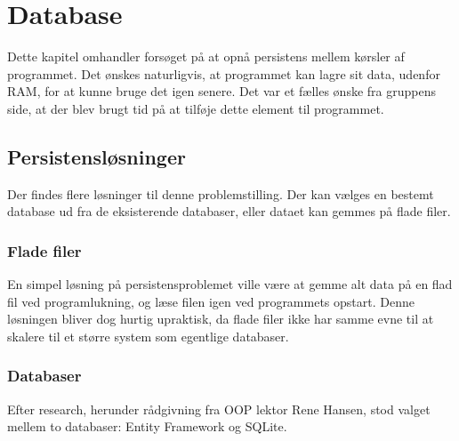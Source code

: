 \chapter{Database}\label{chap:database}

Dette kapitel omhandler forsøget på at opnå persistens mellem kørsler af programmet.
Det ønskes naturligvis, at programmet kan lagre sit data, udenfor RAM, for at kunne bruge det igen senere. 
Det var et fælles ønske fra gruppens side, at der blev brugt tid på at tilføje dette element til programmet. 

\section{Persistensløsninger}

Der findes flere løsninger til denne problemstilling. 
Der kan vælges en bestemt database ud fra de eksisterende databaser, eller dataet kan gemmes på flade filer.

\subsection{Flade filer}
En simpel løsning på persistensproblemet ville være at gemme alt data på en flad fil ved programlukning, og læse filen igen ved programmets opstart.
Denne løsningen bliver dog hurtig upraktisk, da flade filer ikke har samme evne til at skalere til et større system som egentlige databaser.

\subsection{Databaser}
Efter research, herunder rådgivning fra OOP lektor Rene Hansen, stod valget mellem to databaser: Entity Framework og SQLite.

